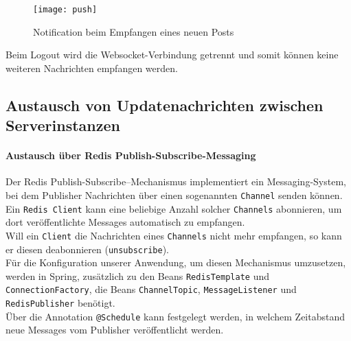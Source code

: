 \begin{figure}[!htb]
  \begin{center}
      \texttt{[image: push]}
    \caption{Notification beim Empfangen eines neuen Posts}
    \label{fig:push}
  \end{center}
\end{figure}

Beim Logout wird die Websocket-Verbindung getrennt und somit können keine weiteren Nachrichten empfangen werden.

\newpage
\subsection{Austausch von Updatenachrichten zwischen
Serverinstanzen}
\paragraph{Austausch über Redis Publish-Subscribe-Messaging}
Der Redis Publish-Subscribe--Mechanismus implementiert ein Messaging-System, bei dem Publisher Nachrichten
über einen sogenannten \texttt{Channel} senden können. \\
Ein \texttt{Redis Client} kann eine beliebige Anzahl solcher \texttt{Channels} abonnieren, um dort veröffentlichte Messages automatisch zu empfangen. \\
Will ein \texttt{Client} die Nachrichten eines \texttt{Channels}
nicht mehr empfangen, so kann er diesen deabonnieren (\texttt{unsubscribe}). \\
Für die Konfiguration unserer Anwendung, um diesen Mechanismus umzusetzen, werden in Spring, zusätzlich zu den Beans \texttt{RedisTemplate} und \texttt{ConnectionFactory}, die Beans \texttt{ChannelTopic}, \texttt{MessageListener} und \texttt{RedisPublisher} benötigt. \\
Über die Annotation \texttt{@Schedule} kann festgelegt werden, in welchem
Zeitabstand neue Messages vom Publisher veröffentlicht werden.
